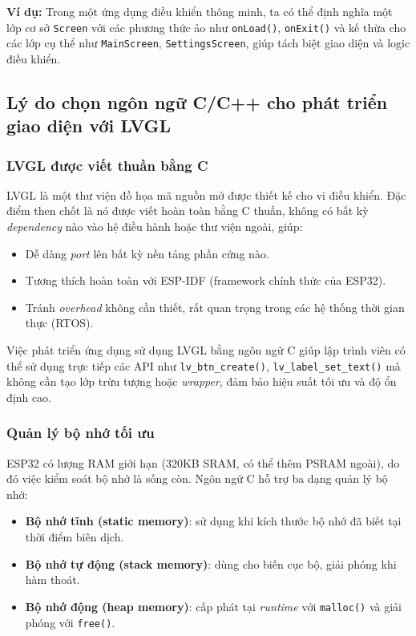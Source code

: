 \textbf{Ví dụ:} Trong một ứng dụng điều khiển thông minh, ta có thể định nghĩa một lớp cơ sở \texttt{Screen} với các phương thức ảo như \texttt{onLoad()}, \texttt{onExit()} và kế thừa cho các lớp cụ thể như \texttt{MainScreen}, \texttt{SettingsScreen}, giúp tách biệt giao diện và logic điều khiển.

\subsection{Lý do chọn ngôn ngữ C/C++ cho phát triển giao diện với LVGL}

\subsubsection{LVGL được viết thuần bằng C}
LVGL là một thư viện đồ họa mã nguồn mở được thiết kế cho vi điều khiển. Đặc điểm then chốt là nó được viết hoàn toàn bằng C thuần, không có bất kỳ \textit{dependency} nào vào hệ điều hành hoặc thư viện ngoài, giúp:
\begin{itemize}
  \item Dễ dàng \textit{port} lên bất kỳ nền tảng phần cứng nào.
  \item Tương thích hoàn toàn với ESP-IDF (framework chính thức của ESP32).
  \item Tránh \textit{overhead} không cần thiết, rất quan trọng trong các hệ thống thời gian thực (RTOS).
\end{itemize}

Việc phát triển ứng dụng sử dụng LVGL bằng ngôn ngữ C giúp lập trình viên có thể sử dụng trực tiếp các API như \texttt{lv\_btn\_create()}, \texttt{lv\_label\_set\_text()} mà không cần tạo lớp trừu tượng hoặc \textit{wrapper}, đảm bảo hiệu suất tối ưu và độ ổn định cao.

\subsubsection{Quản lý bộ nhớ tối ưu}
ESP32 có lượng RAM giới hạn (320KB SRAM, có thể thêm PSRAM ngoài), do đó việc kiểm soát bộ nhớ là sống còn. Ngôn ngữ C hỗ trợ ba dạng quản lý bộ nhớ:
\begin{itemize}
  \item \textbf{Bộ nhớ tĩnh (static memory)}: sử dụng khi kích thước bộ nhớ đã biết tại thời điểm biên dịch.
  \item \textbf{Bộ nhớ tự động (stack memory)}: dùng cho biến cục bộ, giải phóng khi hàm thoát.
  \item \textbf{Bộ nhớ động (heap memory)}: cấp phát tại \textit{runtime} với \texttt{malloc()} và giải phóng với \texttt{free()}.
\end{itemize}

